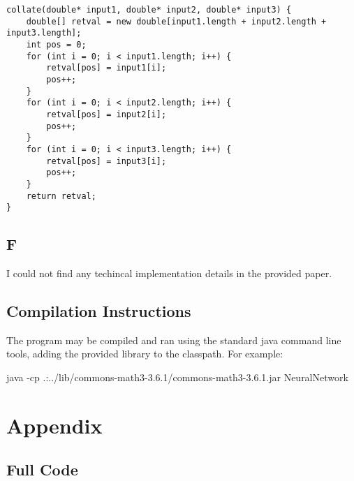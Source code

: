 \documentclass{article}
\begin{document}
\begin{lstlisting}
collate(double* input1, double* input2, double* input3) {
	double[] retval = new double[input1.length + input2.length + input3.length];
	int pos = 0;
	for (int i = 0; i < input1.length; i++) {
		retval[pos] = input1[i];
		pos++;
	}
	for (int i = 0; i < input2.length; i++) {
		retval[pos] = input2[i];
		pos++;
	}
	for (int i = 0; i < input3.length; i++) {
		retval[pos] = input3[i];
		pos++;
	}
	return retval;
}
\end{lstlisting}

\subsection*{F}
I could not find any techincal implementation details in the provided paper.

\subsection*{Compilation Instructions}
The program may be compiled and ran using the standard java command line tools, adding the provided library to the classpath. For example:

java -cp .:../lib/commons-math3-3.6.1/commons-math3-3.6.1.jar NeuralNetwork


\newpage
\section*{Appendix}
\subsection*{Full Code}
\end{document}
